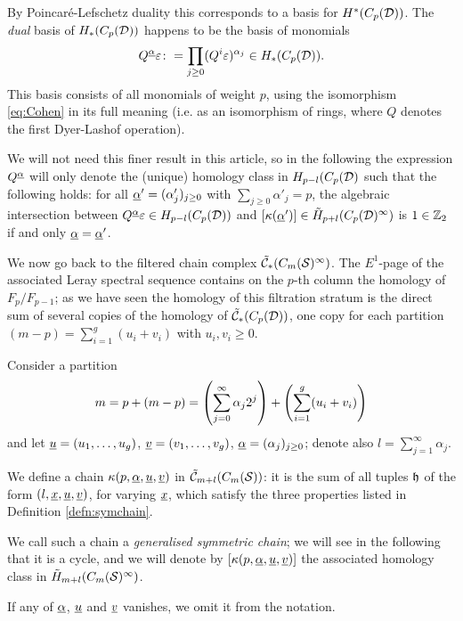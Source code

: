 By Poincaré-Lefschetz duality this corresponds to a basis for $H^*(C_p(\mathcal{D}))$.
The \emph{dual} basis of $H_*(C_p(\mathcal{D}))$
happens to be the basis of monomials
\[
Q^{\underline{\alpha}}\varepsilon\colon =\prod_{j\geq 0}(Q^i\varepsilon)^{\alpha_j}\in H_*(C_p(\mathcal{D})).
\]
This basis consists of all monomials
of weight $p$, using
the isomorphism \eqref{eq:Cohen} in its full meaning (i.e. as an isomorphism of rings,
where $Q$ denotes the first Dyer-Lashof operation).


We will not need this finer result in this article, so in the following the expression
$Q^{\underline{\alpha}}$ will only denote
the (unique) homology class in $H_{p-l}(C_p(\mathcal{D})$ such that the following holds:
for all $\underline{\alpha}'=(\alpha'_j)_{j\geq 0}$ with $\sum_{j\geq 0}\alpha'_j=p$, the
algebraic intersection between $Q^{\underline{\alpha}}\varepsilon\in H_{p-l}(C_p(\mathcal{D}))$
and $[\kappa(\underline{\alpha}')]\in\tilde{H}_{p+l}(C_p(\mathcal{D})^{\infty})$
is $1\in\mathbb{Z}_2$ if and only $\underline{\alpha}=\underline{\alpha}'$.

We now go back to the filtered chain complex $\tilde{\mathcal{C}}_*(C_m(\mathcal{S})^{\infty})$.
The $E^1$-page of the associated Leray spectral sequence contains on the $p$-th column
the homology of $F_p/F_{p-1}$; as we have seen the homology of this filtration stratum is
the direct sum of several copies of the homology of $\tilde{\mathcal{C}}_*(C_p(\mathcal{D}))$, one copy for each
partition $(m-p)=\sum_{i=1}^g (u_i+v_i)$ with $u_i,v_i\geq 0$.

\begin{defn}
\label{defn:gensymchain}
Consider a partition
\[
 m=p+(m-p)=\left(\sum_{j=0}^{\infty}\alpha_j2^j\right)+\left(\sum_{i=1}^g(u_i+v_i)\right)
\]
and let $\underline{u}=(u_1,\dots,u_g)$, $\underline{v}=(v_1,\dots, v_g)$, $\underline{\alpha}=(\alpha_j)_{j\geq 0}$; denote also $l=\sum_{j=1}^{\infty}\alpha_j$.

We define a chain $\kappa(p,\underline{\alpha},\underline{u},\underline{v})$ in
$\tilde{\mathcal{C}}_{m+l}(C_m(\mathcal{S}))$: it
is the sum of all tuples $\mathfrak{h}$ of the form $\left(l,\underline{x},\underline{u},\underline{v}\right)$, for varying $\underline{x}$,
which satisfy the three properties listed in Definition \ref{defn:symchain}.

We call such a chain a
\emph{generalised symmetric chain}; we will see in the following that it is a cycle, and we will
denote by $[\kappa(p,\underline{\alpha},\underline{u},\underline{v})]$ the associated homology class in $\tilde{H}_{m+l}(C_m(\mathcal{S})^{\infty})$.

If any of $\underline{\alpha}$, $\underline{u}$ and $\underline{v}$ vanishes, we omit it from the notation.
\end{defn}

